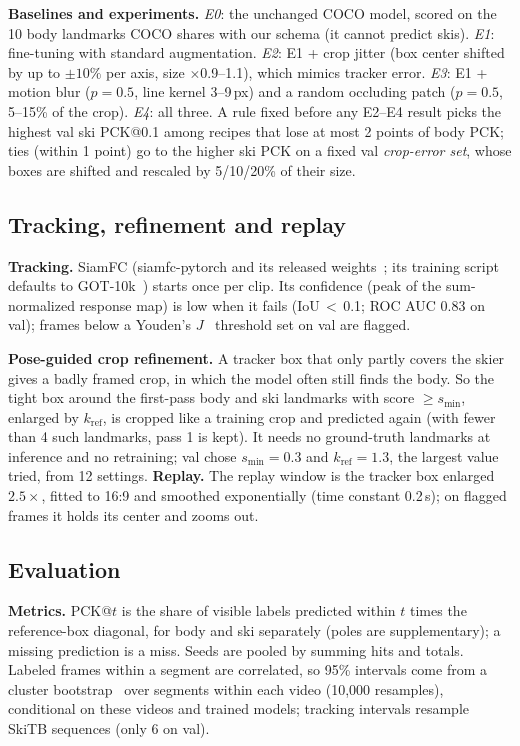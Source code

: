 \documentclass{article}
\begin{document}
\textbf{Baselines and experiments.} \emph{E0}: the unchanged COCO model, scored on the 10 body landmarks COCO shares
with our schema (it cannot predict skis). \emph{E1}: fine-tuning with
standard augmentation. \emph{E2}: E1 + crop jitter (box center shifted by up to $\pm10\%$ per axis, size
$\times$0.9--1.1), which mimics tracker error. \emph{E3}: E1 + motion blur ($p=0.5$, line kernel 3--9\,px) and a
random occluding patch ($p=0.5$, 5--15\% of the crop). \emph{E4}: all three. A rule fixed before any E2--E4 result
picks the highest val ski PCK@0.1 among recipes that lose at most 2 points of body PCK; ties (within 1 point) go to
the higher ski PCK on a fixed val \emph{crop-error set}, whose boxes are shifted and rescaled by 5/10/20\% of their
size.

\subsection{Tracking, refinement and replay}
\textbf{Tracking.} SiamFC (siamfc-pytorch and its released weights~\cite{huang2019siamfcpytorch}; its training
script defaults to GOT-10k~\cite{huang2019got}) starts once per clip. Its confidence (peak of the
sum-normalized response map) is low when it fails (IoU\,$<$\,0.1; ROC AUC 0.83 on val); frames below a Youden's
$J$~\cite{youden1950index} threshold set on val are flagged.

\textbf{Pose-guided crop refinement.} A tracker box that only partly covers the skier gives a badly framed crop, in
which the model often still finds the body. So the tight box around the first-pass body and ski landmarks with
score $\geq s_{\min}$, enlarged by $k_{\mathrm{ref}}$, is cropped like a training crop and predicted again (with
fewer than 4 such landmarks, pass 1 is kept). It needs no ground-truth landmarks at
inference and no retraining; val chose $s_{\min}=0.3$ and $k_{\mathrm{ref}}=1.3$, the largest value tried, from 12
settings. \textbf{Replay.} The replay window is the tracker box enlarged $2.5\times$, fitted to 16:9 and smoothed
exponentially (time constant 0.2\,s); on flagged frames it holds its center and zooms out.

\subsection{Evaluation}
\textbf{Metrics.} PCK@$t$ is the share of visible labels predicted within $t$ times the reference-box diagonal, for
body and ski separately (poles are supplementary); a missing prediction is a miss. Seeds are pooled by summing hits
and totals. Labeled frames within a segment are correlated, so 95\% intervals come from a cluster
bootstrap~\cite{efron1994introduction} over segments within each video (10,000 resamples), conditional on these
videos and trained models; tracking intervals resample SkiTB sequences (only 6 on val).
\end{document}
